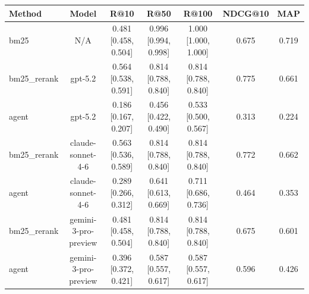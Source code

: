 \begin{table}[t]
\centering
\begin{tabular}{lcccccc}
\toprule
\textbf{Method} & \textbf{Model} & \textbf{R@10} & \textbf{R@50} & \textbf{R@100} & \textbf{NDCG@10} & \textbf{MAP} \\
\midrule
bm25 & N/A & 0.481 [0.458, 0.504] & 0.996 [0.994, 0.998] & 1.000 [1.000, 1.000] & 0.675 & 0.719 \\
bm25_rerank & gpt-5.2 & 0.564 [0.538, 0.591] & 0.814 [0.788, 0.840] & 0.814 [0.788, 0.840] & 0.775 & 0.661 \\
agent & gpt-5.2 & 0.186 [0.167, 0.207] & 0.456 [0.422, 0.490] & 0.533 [0.500, 0.567] & 0.313 & 0.224 \\
bm25_rerank & claude-sonnet-4-6 & 0.563 [0.536, 0.589] & 0.814 [0.788, 0.840] & 0.814 [0.788, 0.840] & 0.772 & 0.662 \\
agent & claude-sonnet-4-6 & 0.289 [0.266, 0.312] & 0.641 [0.613, 0.669] & 0.711 [0.686, 0.736] & 0.464 & 0.353 \\
bm25_rerank & gemini-3-pro-preview & 0.481 [0.458, 0.504] & 0.814 [0.788, 0.840] & 0.814 [0.788, 0.840] & 0.675 & 0.601 \\
agent & gemini-3-pro-preview & 0.396 [0.372, 0.421] & 0.587 [0.557, 0.617] & 0.587 [0.557, 0.617] & 0.596 & 0.426 \\
\bottomrule
\end{tabular}
\end{table}